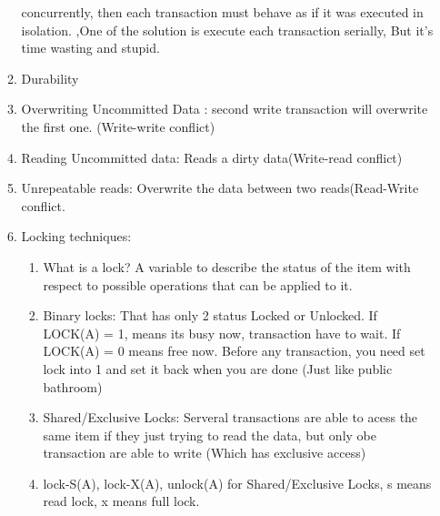 \begin{enumerate}
\begin{enumerate}
concurrently, then each transaction must
behave as if it was executed in isolation.
        ,One of the solution is execute each transaction serially, But it's time wasting and stupid.
        \item Durability
        \item Overwriting Uncommitted Data : second write transaction will overwrite the first one. (Write-write conflict)
        \item Reading Uncommitted data: Reads a dirty data(Write-read conflict)
        \item Unrepeatable reads: Overwrite the data between two reads(Read-Write conflict.
        \item Locking techniques:
        \begin{enumerate}
            \item What is a lock? A variable to describe the status of the item with respect to possible operations that can be applied to it.
            \item Binary locks: That has only 2 status Locked or Unlocked. If LOCK(A) = 1, means its busy now, transaction have to wait. If LOCK(A) = 0 means free now. Before any transaction, you need set lock into 1 and set it back when you are done (Just like public bathroom)
            \item Shared/Exclusive Locks: Serveral transactions are able to acess the same item if they just trying to read the data, but only obe transaction are able to write (Which has exclusive access)
            \item  lock-S(A), lock-X(A), unlock(A) for Shared/Exclusive Locks, s means read lock, x means full lock.
        \end{enumerate}
    \end{enumerate}
\end{enumerate}